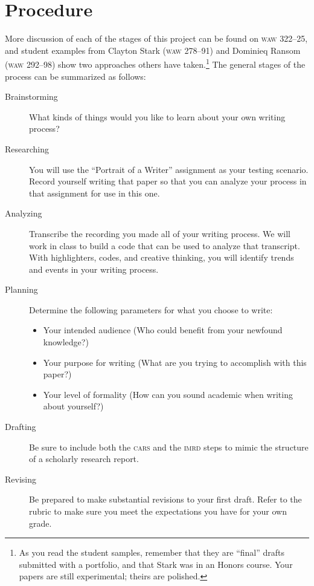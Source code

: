 \documentclass[10pt, oneside]{amsart}	%
\begin{document}
\section{Procedure} %
\label{sec:procedure}
More discussion of each of the stages of this project can be found on \textsc{waw} 322–25, and student examples from Clayton Stark (\textsc{waw} 278–91) and Dominieq Ransom (\textsc{waw} 292–98) show two approaches others have taken.\footnote{As you read the student samples, remember that they are “final” drafts submitted with a portfolio, and that Stark was in an Honors course. Your papers are still experimental; theirs are polished.} The general stages of the process can be summarized as follows:
\begin{description}
	\item[Brainstorming] What kinds of things would you like to learn about your own writing process?
	\item[Researching] You will use the “Portrait of a Writer” assignment as your testing scenario. Record yourself writing that paper so that you can analyze your process in that assignment for use in this one.
	\item[Analyzing] Transcribe the recording you made all of your writing process.	We will work in class to build a code that can be used to analyze that transcript. With highlighters, codes, and creative thinking, you will identify trends and events in your writing process.%
	\item[Planning] Determine the following parameters for what you choose to write:
	\begin{itemize}
		\item Your intended audience (Who could benefit from your newfound knowledge?)
		\item Your purpose for writing (What are you trying to accomplish with this paper?)
		\item Your level of formality (How can you sound academic when writing about yourself?)
	\end{itemize}
	\item[Drafting] Be sure to include both the \textsc{cars} and the \textsc{imrd} steps to mimic the structure of a scholarly research report.
	\item[Revising] Be prepared to make substantial revisions to your first draft. Refer to the rubric to make sure you meet the expectations you have for your own grade.
\end{description}%
\end{document}
